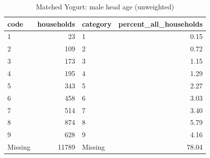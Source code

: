 \begin{table}
\caption{Matched Yogurt: male head age (unweighted)}
\begin{tabular}{lrlr}
\toprule
code & households & category & percent\_all\_households \\
\midrule
1 & 23 & 1 & 0.15 \\
2 & 109 & 2 & 0.72 \\
3 & 173 & 3 & 1.15 \\
4 & 195 & 4 & 1.29 \\
5 & 343 & 5 & 2.27 \\
6 & 458 & 6 & 3.03 \\
7 & 514 & 7 & 3.40 \\
8 & 874 & 8 & 5.79 \\
9 & 628 & 9 & 4.16 \\
Missing & 11789 & Missing & 78.04 \\
\bottomrule
\end{tabular}
\end{table}
